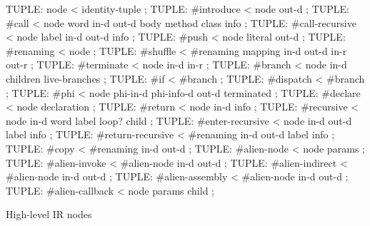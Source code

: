 \centering

  \begin{factorcode}
    TUPLE: node < identity-tuple ;
    TUPLE: #introduce < node out-d ;
    TUPLE: #call < node word in-d out-d body method class info ;
    TUPLE: #call-recursive < node label in-d out-d info ;
    TUPLE: #push < node literal out-d ;
    TUPLE: #renaming < node ;
    TUPLE: #shuffle < #renaming mapping in-d out-d in-r out-r ;
    TUPLE: #terminate < node in-d in-r ;
    TUPLE: #branch < node in-d children live-branches ;
    TUPLE: #if < #branch ;
    TUPLE: #dispatch < #branch ;
    TUPLE: #phi < node phi-in-d phi-info-d out-d terminated ;
    TUPLE: #declare < node declaration ;
    TUPLE: #return < node in-d info ;
    TUPLE: #recursive < node in-d word label loop? child ;
    TUPLE: #enter-recursive < node in-d out-d label info ;
    TUPLE: #return-recursive < #renaming in-d out-d label info ;
    TUPLE: #copy < #renaming in-d out-d ;
    TUPLE: #alien-node < node params ;
    TUPLE: #alien-invoke < #alien-node in-d out-d ;
    TUPLE: #alien-indirect < #alien-node in-d out-d ;
    TUPLE: #alien-assembly < #alien-node in-d out-d ;
    TUPLE: #alien-callback < node params child ;
  \end{factorcode}

\caption{High-level IR nodes}
